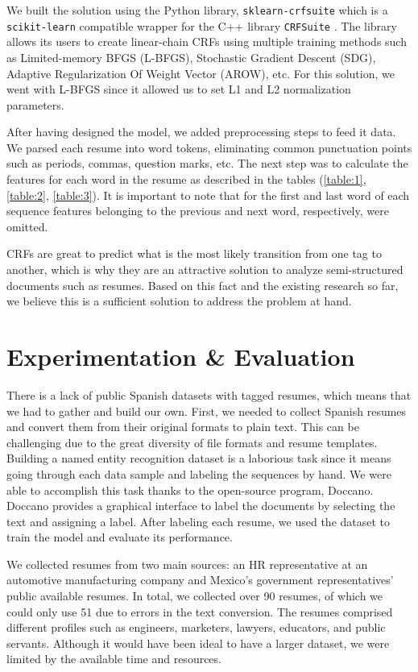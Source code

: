 \documentclass[a4paper, conference]{ieeeconf}
\begin{document}
  We built the solution using the Python library, \texttt{sklearn-crfsuite}
  which is a \texttt{scikit-learn} compatible wrapper for the C++ library
  \texttt{CRFSuite} \cite{CRFsuite}. The library allows its users to create
  linear-chain CRFs using multiple training methods such as Limited-memory
  BFGS (L-BFGS), Stochastic Gradient Descent (SDG), Adaptive Regularization Of
  Weight Vector (AROW), etc. For this solution, we went with L-BFGS since it
  allowed us to set L1 and L2 normalization parameters.

  After having designed the model, we added preprocessing steps to feed it
  data. We parsed each resume into word tokens, eliminating common punctuation
  points such as periods, commas, question marks, etc. The next step was to
  calculate the features for each word in the resume as described in the
  tables (\ref{table:1}, \ref{table:2}, \ref{table:3}). It is important to note
  that for the first and last word of each sequence features belonging to the
  previous and next word, respectively, were omitted.

  CRFs are great to predict what is the most likely transition from one
  tag to another, which is why they are an attractive solution to analyze
  semi-structured documents such as resumes. Based on this fact and the
  existing research so far, we believe this is a sufficient solution to address
  the problem at hand.

  \clearpage
  \section{Experimentation \& Evaluation}
  There is a lack of public Spanish datasets with tagged resumes, which means
  that we had to gather and build our own. First, we needed to collect
  Spanish resumes and convert them from their original formats to plain text.
  This can be challenging due to the great diversity of file formats and resume
  templates. Building a named entity recognition dataset is a laborious
  task since it means going through each data sample and labeling the sequences
  by hand. We were able to accomplish this task thanks to the open-source
  program, Doccano. Doccano provides a graphical interface to label the
  documents by selecting the text and assigning a label. After labeling each
  resume, we used the dataset to train the model and evaluate its performance.

  We collected resumes from two main sources: an HR representative at an
  automotive manufacturing company and Mexico's government representatives'
  public available resumes. In total, we collected over 90 resumes, of which we
  could only use 51 due to errors in the text conversion. The resumes comprised
  different profiles such as engineers, marketers, lawyers, educators, and
  public servants. Although it would have been ideal to have a larger dataset,
  we were limited by the available time and resources.
\end{document}
